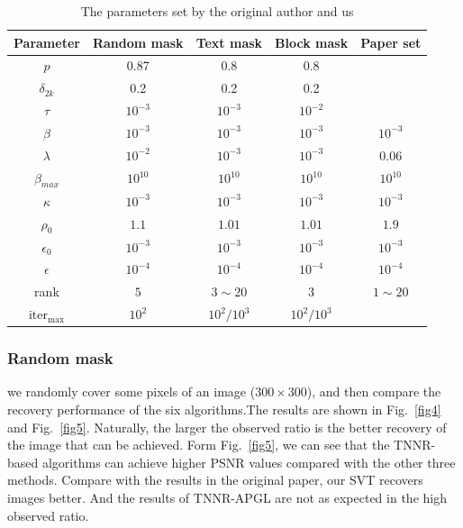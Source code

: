 \documentclass{article}
\begin{document}
{\begin{table}
	\caption{The parameters set by the original author and us}
	\label{t1}
	\centering
	\renewcommand{\arraystretch}{1.25} 
	\begin{tabular}{ccccc}
		\toprule
		Parameter  & Random mask & Text mask  & Block mask & Paper set\\
		\midrule
		$p$ & 0.87 & 0.8 & 0.8 & \\
		$\delta_{2k}$ & 0.2 & 0.2 & 0.2 & \\ 
		$\tau$ & $10^{-3}$ & $10^{-3}$ & $10^{-2}$ & \\
		$\beta$  & $10^{-3}$  & $10^{-3}$ & $10^{-3}$ & $10^{-3}$\\
		$\lambda$ & $ 10^{-2} $ & $10^{-3}$ & $10^{-3}$ & $0.06$\\
		$\beta_{max}$ & $10^{10}$ & $10^{10}$ & $10^{10}$ & $10^{10}$\\
		$\kappa$ & $10^{-3}$ & $10^{-3}$ & $10^{-3}$ & $10^{-3}$\\
		$\rho_0$ & $1.1$ & $1.01$ & $1.01$ & $1.9$\\
		$\epsilon_0$ & $10^{-3}$ & $10^{-3}$ & $10^{-3}$ & $10^{-3}$\\
		$\epsilon$ & $10^{-4}$ & $10^{-4}$ & $10^{-4}$ & $10^{-4}$\\
		rank & $5$ & $3\sim 20$ & $3$ & $1\sim 20$\\
		$\text{iter}_{\max}$ & $10^2$ & $10^2/10^3$ & $10^2/10^3$ & \\
		\bottomrule
	\end{tabular}
\end{table}

\subsubsection{Random mask}
\label{random}
we randomly cover some pixels of an image ($300 \times 300$), and then compare the recovery performance of the six algorithms.The results are shown in Fig.~\ref{fig4} and Fig.~\ref{fig5}. Naturally, the larger the observed ratio is the better recovery of the image that can be achieved. Form Fig.~\ref{fig5}, we can see that the TNNR-based algorithms can achieve higher PSNR values compared with the other three methods. Compare with the results in the original paper, our SVT recovers images better. And the results of TNNR-APGL are not as expected in the high observed ratio.

}
\end{document}
